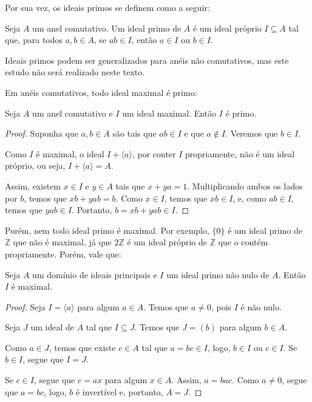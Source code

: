 Por sua vez, os ideais primos se definem como a seguir:

\begin{definition}
    Seja $A$ um anel comutativo.
    Um ideal primo de $A$ é um ideal próprio $I\subseteq A$ tal que, para todos $a, b \in A$, se $ab \in I$, então $a \in I$ ou $b \in I$.
\end{definition}

Ideais primos podem ser generalizados para anéis não comutativos, mas este estudo não será realizado neste texto.

Em anéis comutativos, todo ideal maximal é primo:

\begin{prop}
Seja $A$ um anel comutativo e $I$ um ideal maximal.
Então $I$ é primo.
\end{prop}

\begin{proof}
    Suponha que $a, b \in A$ são tais que $ab \in I$ e que $a \notin I$.
    Veremos que $b \in I$.

    Como $I$ é maximal, o ideal $I+\langle a\rangle$, por conter $I$ propriamente, não é um ideal próprio, ou seja, $I+\langle a\rangle=A$.

    Assim, existem $x \in I$ e $y \in A$ tais que $x+ya=1$.
    Multiplicando ambos os lados por $b$, temos que $xb+yab=b$.
    Como $x \in I$, temos que $xb \in I$, e, como $ab \in I$, temos que $yab \in I$.
    Portanto, $b=xb+yab\in I$.
\end{proof}

Porém, nem todo ideal primo é maximal. Por exemplo, $\{0\}$ é um ideal primo de $\mathbb Z$ que não é maximal, já que $2\mathbb Z$ é um ideal próprio de $\mathbb Z$ que o contém propriamente. Porém, vale que:

\begin{prop}
Seja $A$ um domínio de ideais principais e $I$ um ideal primo não nulo de $A$.
Então $I$ é maximal.
\end{prop}

\begin{proof}
    Seja $I=\langle a\rangle$ para algum $a \in A$.
    Temos que $a \neq 0$, pois $I$ é não nulo.

    Seja $J$ um ideal de $A$ tal que $I\subseteq J$. Temos que $J=(b)$ para algum $b \in A$.

    Como $a \in J$, temos que existe $c \in A$ tal que $a=bc \in I$, logo, $b \in I$ ou $c \in I$.
    Se $b \in I$, segue que $I=J$.
    
    Se $c \in I$, segue que $c=ax$ para algum $x \in A$. Assim, $a=bac$. Como $a\neq 0$, segue que $a=bc$, logo, $b$ é invertível e, portanto, $A=J$.
\end{proof}

